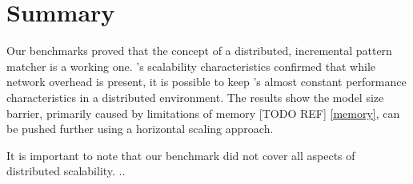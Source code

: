 \section{Summary}

Our benchmarks proved that the concept of a distributed, incremental pattern matcher is a working one. \iqd{}'s scalability characteristics confirmed that while network overhead is present, it is possible to keep \eiq{}'s almost constant performance characteristics in a distributed environment. The results show the model size barrier, primarily caused by limitations of memory [TODO REF] \autoref{memory}, can be pushed further using a horizontal scaling approach.


It is important to note that our benchmark did not cover all aspects of distributed scalability. ..

